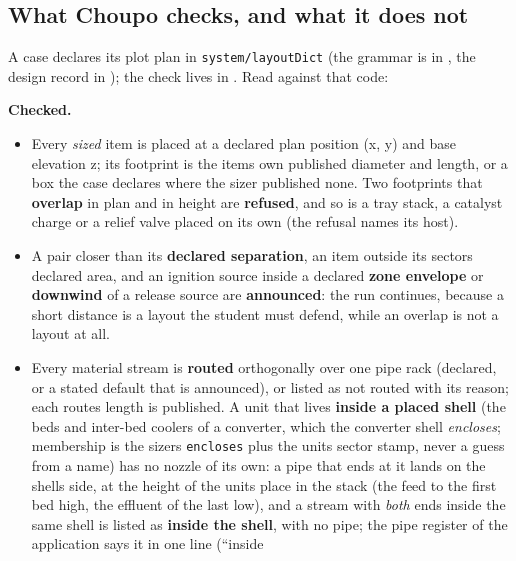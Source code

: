 \documentclass[11pt,a4paper]{article}
\providecommand{\tightlist}{\setlength{\itemsep}{0pt}\setlength{\parskip}{0pt}}
\begin{document}
\hypertarget{what-choupo-checks-and-what-it-does-not}{%
\subsection{What Choupo checks, and what it does
not}\label{what-choupo-checks-and-what-it-does-not}}

A case declares its plot plan in \texttt{system/layoutDict} (the grammar
is in , the design record in
); the check
lives in . Read against
that code:

\textbf{Checked.}
\begin{itemize}
\tightlist
\item
  Every \emph{sized} item is placed at a declared plan position (x, y)
  and base elevation z; its footprint is the item\textquotesingle s own
  published diameter and length, or a box the case declares where the
  sizer published none. Two footprints that \textbf{overlap} in plan and
  in height are \textbf{refused}, and so is a tray stack, a catalyst
  charge or a relief valve placed on its own (the refusal names its
  host).
\item
  A pair closer than its \textbf{declared separation}, an item outside
  its sector\textquotesingle s declared area, and an ignition source
  inside a declared \textbf{zone envelope} or \textbf{downwind} of a
  release source are \textbf{announced}: the run continues, because a
  short distance is a layout the student must defend, while an overlap is
  not a layout at all.
\item
  Every material stream is \textbf{routed} orthogonally over one pipe
  rack (declared, or a stated default that is announced), or listed as
  not routed with its reason; each route\textquotesingle s length is
  published. A unit that lives \textbf{inside a placed shell} (the beds
  and inter-bed coolers of a converter, which the converter shell
  \emph{encloses}; membership is the sizer\textquotesingle s
  \texttt{encloses} plus the unit\textquotesingle s sector stamp, never a
  guess from a name) has no nozzle of its own: a pipe that ends at it
  lands on the shell\textquotesingle s side, at the height of the
  unit\textquotesingle s place in the stack (the feed to the first bed
  high, the effluent of the last low), and a stream with \emph{both} ends
  inside the same shell is listed as \textbf{inside the shell}, with no
  pipe; the pipe register of the application says it in one line (``inside

\end{itemize}
\end{document}
